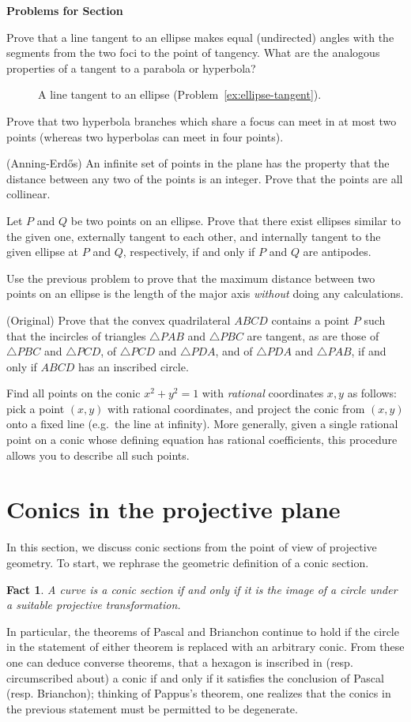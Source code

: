 \documentclass[12pt]{book}
\newcounter{exc}
\numberwithin{exc}{section}
\numberwithin{figure}{section}
\newenvironment{exer}{\vspace{0.1in}
\noindent \textbf{Problems for Section~\thesection} \vspace{0.1in}
\begin{list}{\arabic{exc}.}{\usecounter{exc}}}{\end{list}}
\newtheorem{fact}[theorem]{Fact}
\numberwithin{equation}{theorem}
\def\ii{\item}
\begin{document}
\begin{exer}
\ii \label{ex:ellipse-tangent}
Prove that a line tangent to an ellipse makes equal 
(undirected) angles with the
segments from the two foci to the point of tangency. What are
the analogous properties of a tangent to a parabola or hyperbola?
\begin{figure}[ht]
\caption{A line tangent to an ellipse (Problem~\ref{ex:ellipse-tangent}).}
\end{figure}
\ii
Prove that two hyperbola branches which share a focus can meet in at most
two points (whereas two hyperbolas can meet in four points).
\ii (Anning-Erd\H{o}s) 
An infinite set of points in the plane has the 
property that the distance between any two of the points is an 
integer. Prove that the points are all collinear.
\ii
Let $P$ and $Q$ be two points on an ellipse. Prove that there exist 
ellipses similar to the given one,
externally tangent to each other, and internally tangent to 
the given ellipse at $P$ and $Q$, respectively, if and only if $P$ 
and $Q$ are antipodes.
\ii
Use the previous problem to prove
that the maximum distance between two points on an ellipse is
the length of the major axis \emph{without} doing any 
calculations.
\ii (Original)
Prove that the convex quadrilateral $ABCD$ contains a point $P$ such that 
the incircles of triangles $\triangle PAB$ and $\triangle PBC$ are tangent,
as are those 
of $\triangle PBC$ and $\triangle PCD$, of $\triangle PCD$ 
and $\triangle PDA$, and of $\triangle PDA$ and $\triangle PAB$, if 
and only if $ABCD$ has an inscribed circle.
\ii
Find all points on the conic $x^{2}+y^{2}=1$ with \emph{rational} 
coordinates $x,y$ as follows: pick a point $(x,y)$ with rational 
coordinates, and project the conic from $(x,y)$ onto a fixed line 
(e.g.\ the line at infinity). More generally, given a single rational 
point on a conic whose defining equation has rational coefficients, 
this procedure allows you to describe all such points.
\end{exer}

\section{Conics in the projective plane}
In this section, we discuss conic sections from the point of view of 
projective geometry. To start, we rephrase the geometric definition
of a conic section.
\begin{fact}
A curve is a conic section if and only if it is the image of a circle under a 
suitable projective transformation.
\end{fact}
In particular, the theorems of Pascal and Brianchon continue to hold 
if the circle in the statement of either theorem is replaced with an 
arbitrary conic. From these one can deduce converse theorems, that a 
hexagon is inscribed in (resp. circumscribed about) a conic if and 
only if it satisfies the conclusion of Pascal (resp. Brianchon); 
thinking of Pappus's theorem, one realizes that the conics in the 
previous statement must be permitted to be degenerate.
\end{document}
